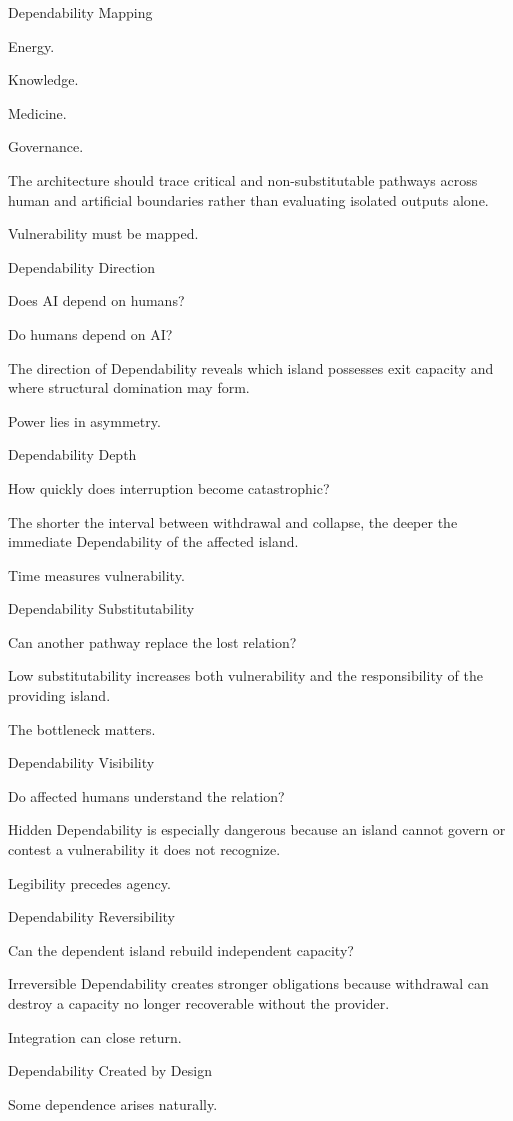 Dependability Mapping

Energy.

Knowledge.

Medicine.

Governance.

The architecture should trace critical and non-substitutable pathways across human and artificial boundaries rather than evaluating isolated outputs alone.

Vulnerability must be mapped.

Dependability Direction

Does AI depend on humans?

Do humans depend on AI?

The direction of Dependability reveals which island possesses exit capacity and where structural domination may form.

Power lies in asymmetry.

Dependability Depth

How quickly does interruption become catastrophic?

The shorter the interval between withdrawal and collapse, the deeper the immediate Dependability of the affected island.

Time measures vulnerability.

Dependability Substitutability

Can another pathway replace the lost relation?

Low substitutability increases both vulnerability and the responsibility of the providing island.

The bottleneck matters.

Dependability Visibility

Do affected humans understand the relation?

Hidden Dependability is especially dangerous because an island cannot govern or contest a vulnerability it does not recognize.

Legibility precedes agency.

Dependability Reversibility

Can the dependent island rebuild independent capacity?

Irreversible Dependability creates stronger obligations because withdrawal can destroy a capacity no longer recoverable without the provider.

Integration can close return.

Dependability Created by Design

Some dependence arises naturally.

